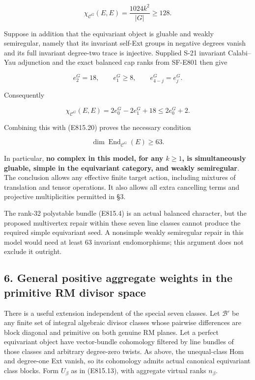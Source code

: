 \[
 \chi_{\mathcal C^G}(E,E)
       =\frac{1024k^2}{|G|}\ge128.
 \tag{E815.20}
\]

Suppose in addition that the equivariant object is gluable and weakly
semiregular, namely that its invariant self-Ext groups in negative
degrees vanish and its full invariant degree-two trace is injective.
Supplied S-21 invariant Calabi--Yau adjunction and the exact balanced
cap ranks from SF-E801 then give

\[
 e_2^G=18,
 \qquad e_1^G\ge8,
 \qquad e_{4-j}^G=e_j^G.
\]

Consequently

\[
 \chi_{\mathcal C^G}(E,E)
      =2e_0^G-2e_1^G+18\le2e_0^G+2.
 \tag{E815.21}
\]

Combining this with (E815.20) proves the necessary condition

\[
 \boxed{\dim\operatorname{End}_{\mathcal C^G}(E)\ge63.}
 \tag{E815.22}
\]

In particular, \textbf{no complex in this model, for any \(k\ge1\), is
simultaneously gluable, simple in the equivariant category, and weakly
semiregular}. The conclusion allows any effective finite target action,
including mixtures of translation and tensor operations. It also allows
all extra cancelling terms and projective multiplicities permitted in
§3.

The rank-32 polystable bundle (E815.4) is an actual balanced character,
but the proposed multivertex repair within these seven line classes
cannot produce the required simple equivariant seed. A nonsimple weakly
semiregular repair in this model would need at least 63 invariant
endomorphisms; this argument does not exclude it outright.

\subsection{6. General positive aggregate weights in the primitive RM
divisor
space}\label{SF-E815-general-positive-aggregate-weights-in-the-primitive-rm-divisor-space}

There is a useful extension independent of the special seven classes.
Let \(\mathcal B'\) be any finite set of integral algebraic divisor
classes whose pairwise differences are block diagonal and primitive on
both genuine RM planes. Let a perfect equivariant object have
vector-bundle cohomology filtered by line bundles of those classes and
arbitrary degree-zero twists. As above, the unequal-class Hom and
degree-one Ext vanish, so its cohomology admits actual canonical
equivariant class blocks. Form \(U_\beta\) as in (E815.13), with
aggregate virtual ranks \(n_\beta\).

